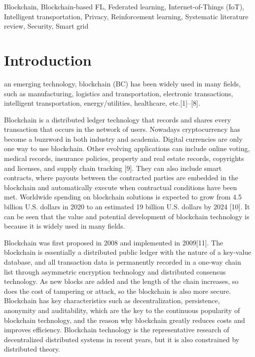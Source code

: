 \documentclass[lettersize,journal]{IEEEtran}
\begin{document}
\begin{IEEEkeywords}
Blockchain, Blockchain-based FL, Federated learning, Internet-of-Things (IoT), Intelligent transportation, Privacy, Reinforcement learning, Systematic literature review, Security, Smart grid
\end{IEEEkeywords}

\section{Introduction}
\label{sec:introduction}
 an emerging technology, blockchain (BC) has been widely used in many fields, such as manufacturing, logistics and transportation, electronic transactions, intelligent transportation, energy/utilities, healthcare, etc.[1]–[8].

Blockchain is a distributed ledger technology that records and shares every transaction that occurs in the network of users. Nowadays cryptocurrency has become a buzzword in both industry and academia. Digital currencies are only one way to use blockchain. Other evolving applications can include online voting, medical records, insurance policies, property and real estate records, copyrights and licenses, and supply chain tracking [9]. They can also include smart contracts, where payouts between the contracted parties are embedded in the blockchain and automatically execute when contractual conditions have been met. Worldwide spending on blockchain solutions is expected to grow from 4.5 billion U.S. dollars in 2020 to an estimated 19 billion U.S. dollars by 2024 [10]. It can be seen that the value and potential development of blockchain technology is because it is widely used in many fields.

Blockchain was first proposed in 2008 and implemented in 2009[11]. The blockchain is essentially a distributed public ledger with the nature of a key-value database, and all transaction data is permanently recorded in a one-way chain list through asymmetric encryption technology and distributed consensus technology. As new blocks are added and the length of the chain increases, so does the cost of tampering or attack, so the blockchain is also more secure. Blockchain has key characteristics such as decentralization, persistence, anonymity and auditability, which are the key to the continuous popularity of blockchain technology, and the reason why blockchain greatly reduces costs and improves efficiency. Blockchain technology is the representative research of decentralized distributed systems in recent years, but it is also constrained by distributed theory.
\end{document}
